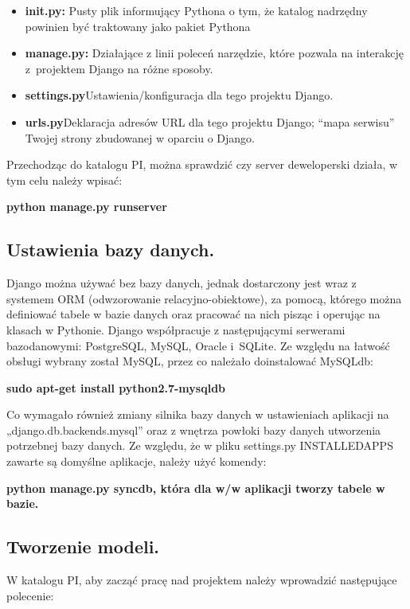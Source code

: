 \documentclass[a4paper,12pt]{article}		%
\begin{document}
\begin{itemize}
\item \textbf{init.py: }Pusty plik informujący Pythona o tym, że katalog nadrzędny powinien być traktowany jako pakiet Pythona 
\item \textbf{manage.py: }Działające z linii poleceń narzędzie, które pozwala na interakcję z~projektem Django na różne sposoby.
\item \textbf{settings.py}Ustawienia/konfiguracja dla tego projektu Django.
\item \textbf{urls.py}Deklaracja adresów URL dla tego projektu Django; “mapa serwisu” Twojej strony zbudowanej w oparciu o Django.
\end{itemize}

Przechodząc do katalogu PI, można sprawdzić czy server deweloperski działa, w tym celu należy wpisać:

\begin{center}
\textbf{python manage.py runserver}
\end{center}

\subsection{Ustawienia bazy danych.}
Django można używać bez bazy danych, jednak dostarczony jest wraz z systemem ORM (odwzorowanie relacyjno-obiektowe), za pomocą, którego można definiować tabele w bazie danych oraz pracować na nich pisząc i operując na klasach w Pythonie. Django współpracuje z następującymi serwerami bazodanowymi: PostgreSQL, MySQL, Oracle i~SQLite. Ze względu na łatwość obsługi wybrany został MySQL, przez co należało doinstalować MySQLdb:

\begin{center}
\textbf{sudo apt-get install python2.7-mysqldb}
\end{center}

Co wymagało również zmiany silnika bazy danych w ustawieniach aplikacji na „django.db.backends.mysql” oraz z wnętrza powłoki bazy danych utworzenia 
potrzebnej bazy danych. Ze względu, że w pliku settings.py INSTALLEDAPPS zawarte są domyślne aplikacje, należy użyć komendy:

\begin{center}
\textbf{python manage.py syncdb, która dla w/w aplikacji tworzy tabele w bazie.}
\end{center}

\subsection{Tworzenie modeli.}
W katalogu PI, aby zacząć pracę nad projektem należy wprowadzić następujące polecenie:
\end{document}
